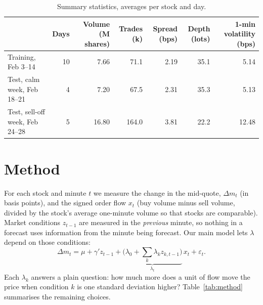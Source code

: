 \documentclass[10pt,letterpaper]{article}
\begin{document}
\begin{table}[h]
\centering\small
\caption{Summary statistics, averages per stock and day.}\label{tab:summary}
\setlength{\tabcolsep}{5pt}
\begin{tabular}{lrrrrrr}
\toprule
 & Days & Volume (M shares) & Trades (k) & Spread (bps) & Depth (lots) & 1-min volatility (bps) \\
\midrule
Training, Feb 3--14 & 10 & 7.66 & 71.1 & 2.19 & 35.1 & 5.14 \\
Test, calm week, Feb 18--21 & 4 & 7.20 & 67.5 & 2.31 & 35.3 & 5.13 \\
Test, sell-off week, Feb 24--28 & 5 & 16.80 & 164.0 & 3.81 & 22.2 & 12.48 \\
\bottomrule
\end{tabular}
\end{table}

\section{Method}
For each stock and minute $t$ we measure the change in the mid-quote, $\Delta m_t$ (in basis points), and the signed order flow $x_t$ (buy volume minus sell volume, divided by the stock's average one-minute volume so that stocks are comparable). Market conditions $z_{t-1}$ are measured in the \emph{previous} minute, so nothing in a forecast uses information from the minute being forecast. Our main model lets $\lambda$ depend on those conditions:
\begin{equation}
\Delta m_t = \mu + \gamma' z_{t-1} + \underbrace{\Big(\lambda_0 + \textstyle\sum_k \lambda_k z_{k,t-1}\Big)}_{\lambda_t}\, x_t + \varepsilon_t .
\end{equation}
Each $\lambda_k$ answers a plain question: how much more does a unit of flow move the price when condition $k$ is one standard deviation higher? Table~\ref{tab:method} summarises the remaining choices.
\end{document}
